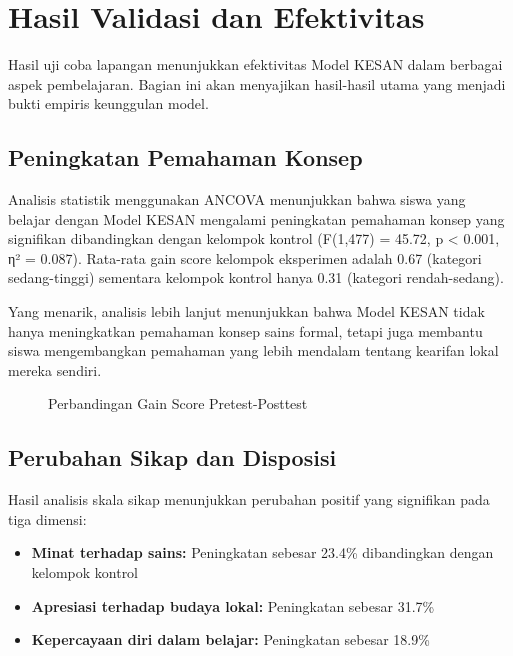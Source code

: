 \documentclass[12pt,a4paper,oneside]{book}
\begin{document}
\section{Hasil Validasi dan Efektivitas}

Hasil uji coba lapangan menunjukkan efektivitas Model KESAN dalam berbagai aspek pembelajaran. Bagian ini akan menyajikan hasil-hasil utama yang menjadi bukti empiris keunggulan model.

\subsection{Peningkatan Pemahaman Konsep}

Analisis statistik menggunakan ANCOVA menunjukkan bahwa siswa yang belajar dengan Model KESAN mengalami peningkatan pemahaman konsep yang signifikan dibandingkan dengan kelompok kontrol (F(1,477) = 45.72, p < 0.001, η² = 0.087). Rata-rata gain score kelompok eksperimen adalah 0.67 (kategori sedang-tinggi) sementara kelompok kontrol hanya 0.31 (kategori rendah-sedang).

Yang menarik, analisis lebih lanjut menunjukkan bahwa Model KESAN tidak hanya meningkatkan pemahaman konsep sains formal, tetapi juga membantu siswa mengembangkan pemahaman yang lebih mendalam tentang kearifan lokal mereka sendiri.

\begin{figure}[H]
  \centering
  \caption{Perbandingan Gain Score Pretest-Posttest}
  \label{fig:gain_scores}
\end{figure}

\subsection{Perubahan Sikap dan Disposisi}

Hasil analisis skala sikap menunjukkan perubahan positif yang signifikan pada tiga dimensi:
\begin{itemize}
\item \textbf{Minat terhadap sains:} Peningkatan sebesar 23.4\% dibandingkan dengan kelompok kontrol
\item \textbf{Apresiasi terhadap budaya lokal:} Peningkatan sebesar 31.7\%
\item \textbf{Kepercayaan diri dalam belajar:} Peningkatan sebesar 18.9\%
\end{itemize}
\end{document}
